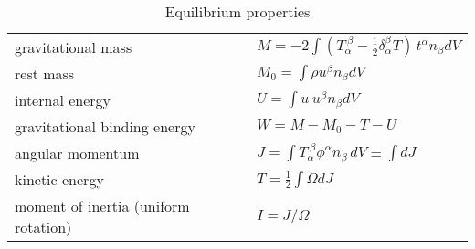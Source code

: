 \documentclass[12pt]{article}
\begin{document}
{\begin{table}
\begin{minipage}{75mm}
\caption{Equilibrium properties}
\begin{tabular}{*{2}{l}}
\\
\hline
gravitational mass & 
$M= -2 \int(T_\alpha^{\ \beta} -\frac12 \delta_\alpha^\beta T)\, t^\alpha n_\beta dV$
\\[0.5ex]
rest mass  & $M_0 = \int \rho u^\beta  n_\beta dV$  \\[0.5ex]
internal energy & $U = \int u\ u^\beta n_\beta dV $\\[0.5ex]
gravitational binding energy & $W=M - M_0 - T - U$ \\[0.5ex]
angular momentum & $J=\int T_\alpha^{\ \beta} \phi^\alpha n_\beta\, dV\equiv \int dJ$ \\[0.5ex]
kinetic energy & $T=\frac12\int  \Omega dJ$\\[0.5ex]
moment of inertia (uniform rotation) & $I=J / \Omega$  \\[0.5ex]

\hline
\end{tabular}
\label{tab_equ}
\end{minipage}
\end{table}

}
\end{document}
